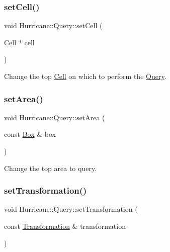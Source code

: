 \subsubsection{\texorpdfstring{set\+Cell()}{setCell()}}
{\footnotesize\ttfamily void Hurricane\+::\+Query\+::set\+Cell (\begin{DoxyParamCaption}\item[{\mbox{\hyperlink{classHurricane_1_1Cell}{Cell}} $\ast$}]{cell }\end{DoxyParamCaption})\hspace{0.3cm}{\ttfamily [inline]}}

Change the top \mbox{\hyperlink{classHurricane_1_1Cell}{Cell}} on which to perform the \mbox{\hyperlink{classHurricane_1_1Query}{Query}}. \mbox{\label{classHurricane_1_1Query_ac41de6b1535c256c4929c075769890b1}} 
\subsubsection{\texorpdfstring{set\+Area()}{setArea()}}
{\footnotesize\ttfamily void Hurricane\+::\+Query\+::set\+Area (\begin{DoxyParamCaption}\item[{const \mbox{\hyperlink{classHurricane_1_1Box}{Box}} \&}]{box }\end{DoxyParamCaption})\hspace{0.3cm}{\ttfamily [inline]}}

Change the top area to query. \mbox{\label{classHurricane_1_1Query_a885360fc2f351fc3612c7dda363b5131}} 
\subsubsection{\texorpdfstring{set\+Transformation()}{setTransformation()}}
{\footnotesize\ttfamily void Hurricane\+::\+Query\+::set\+Transformation (\begin{DoxyParamCaption}\item[{const \mbox{\hyperlink{classHurricane_1_1Transformation}{Transformation}} \&}]{transformation }\end{DoxyParamCaption})\hspace{0.3cm}{\ttfamily [inline]}}

